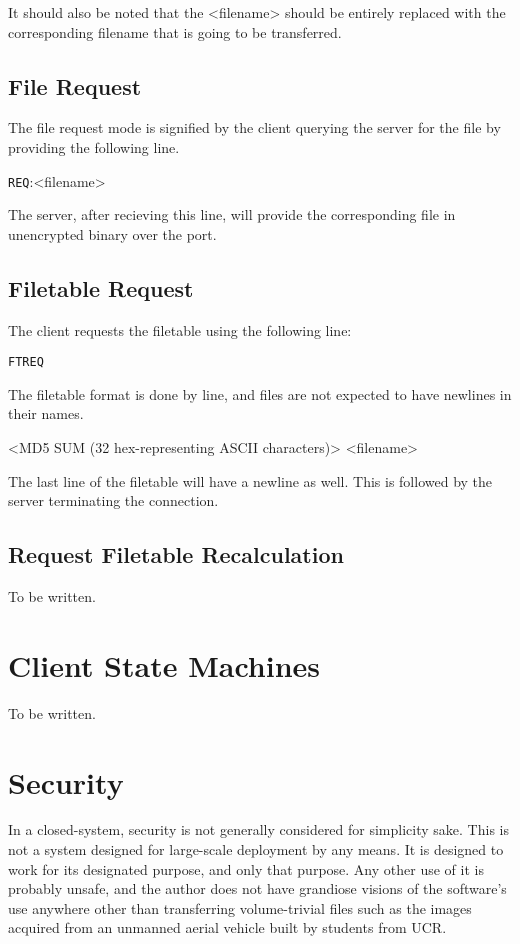 \documentclass[12pt]{article}
\begin{document}
It should also be noted that the <filename> should be entirely replaced with
the corresponding filename that is going to be transferred.

\subsection{File Request}
\label{ssec:Request File}
The file request mode is signified by the client querying the server for the
file by providing the following line.

\begin{center}
	\noindent
	\verb+REQ+:\textvisiblespace <filename>\carriagereturn\carriagereturn
\end{center}

The server, after recieving this line, will provide the corresponding file in
unencrypted binary over the port.

\subsection{Filetable Request}
\label{ssec:Request Filetable}
The client requests the filetable using the following line:

\begin{center}
	\noindent
	\verb+FTREQ+\carriagereturn\carriagereturn
\end{center}

The filetable format is done by line, and files are not expected to have
newlines in their names.

\begin{center}
	\noindent
	<MD5 SUM (32 hex-representing ASCII characters)>\textvisiblespace
	\textvisiblespace<filename>\carriagereturn
\end{center}

The last line of the filetable will have a newline as well.  This is followed
by the server terminating the connection.

\subsection{Request Filetable Recalculation}
\label{ssec:Recalculate MD5}
To be written.

\section{Client State Machines}
To be written.

\section{Security}
\label{sec:Security}
In a closed-system, security is not generally considered for simplicity sake.
This is not a system designed for large-scale deployment by any means.
It is designed to work for its designated purpose, and only that purpose.
Any other use of it is probably unsafe, and the author does not have grandiose
visions of the software's use anywhere other than transferring volume-trivial
files such as the images acquired from an unmanned aerial vehicle built by
students from UCR.
\end{document}
